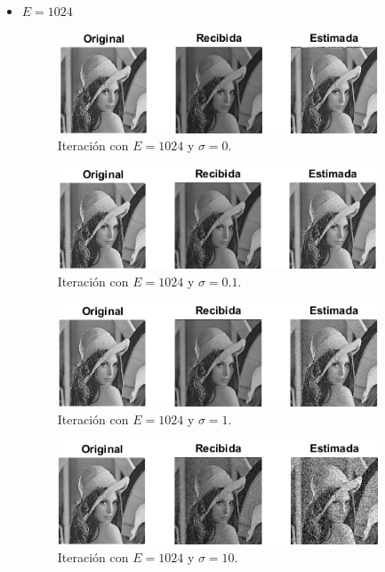 \documentclass[a4paper]{article}
\begin{document}
\begin{itemize}
	\pagebreak
	\item $ E = 1024 $
	\begin{figure}[H]
		\centering
		\includegraphics[width=0.9\textwidth]{E1024S0.png}
		\caption{Iteración con $ E = 1024 $ y $ \sigma = 0 $.}
	\end{figure}
	\begin{figure}[H]
		\centering
		\includegraphics[width=0.9\textwidth]{E1024S01.png}
		\caption{Iteración con $ E = 1024 $ y $ \sigma = 0.1 $.}
	\end{figure}
	\begin{figure}[H]
		\centering
		\includegraphics[width=0.9\textwidth]{E1024S1.png}
		\caption{Iteración con $ E = 1024 $ y $ \sigma = 1 $.}
	\end{figure}
	\begin{figure}[H]
		\centering
		\includegraphics[width=0.9\textwidth]{E1024S10.png}
		\caption{Iteración con $ E = 1024 $ y $ \sigma = 10 $.}
	\end{figure}

\end{itemize}
\end{document}
